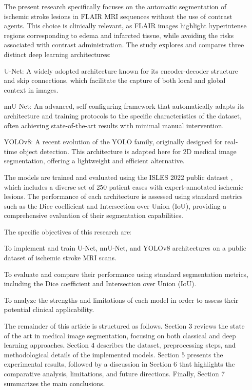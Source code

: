 \documentclass[12pt]{article}
\begin{document}
The present research specifically focuses on the automatic segmentation of ischemic stroke lesions in FLAIR MRI sequences without the use of contrast agents. This choice is clinically relevant, as FLAIR images highlight hyperintense regions corresponding to edema and infarcted tissue, while avoiding the risks associated with contrast administration. The study explores and compares three distinct deep learning architectures:\begin{enumerate*}[label=(\roman*)]
\item U-Net: A widely adopted architecture known for its encoder-decoder structure and skip connections, which facilitate the capture of both local and global context in images.
\item nnU-Net: An advanced, self-configuring framework that automatically adapts its architecture and training protocols to the specific characteristics of the dataset, often achieving state-of-the-art results with minimal manual intervention.
\item YOLOv8: A recent evolution of the YOLO family, originally designed for real-time object detection. This architecture is adapted here for 2D medical image segmentation, offering a lightweight and efficient alternative.
\end{enumerate*}

The models are trained and evaluated using the ISLES 2022 public dataset \cite{inproceedings}, which includes a diverse set of 250 patient cases with expert-annotated ischemic lesions. The performance of each architecture is assessed using standard metrics such as the Dice coefficient and Intersection over Union (IoU), providing a comprehensive evaluation of their segmentation capabilities.

The specific objectives of this research are:
\begin{enumerate*}[label=(\roman*)]
  \item To implement and train U-Net, nnU-Net, and YOLOv8 architectures on a public dataset of ischemic stroke MRI scans.
  \item To evaluate and compare their performance using standard segmentation metrics, including the Dice coefficient and Intersection over Union (IoU).
  \item To analyze the strengths and limitations of each model in order to assess their potential clinical applicability.
\end{enumerate*}

The remainder of this article is structured as follows. Section 3 reviews the state of the art in medical image segmentation, focusing on both classical and deep learning approaches. Section 4 describes the dataset, preprocessing steps, and methodological details of the implemented models. Section 5 presents the experimental results, followed by a discussion in Section 6 that highlights the comparative analysis, limitations, and future directions. Finally, Section 7 summarizes the main conclusions.
\end{document}
